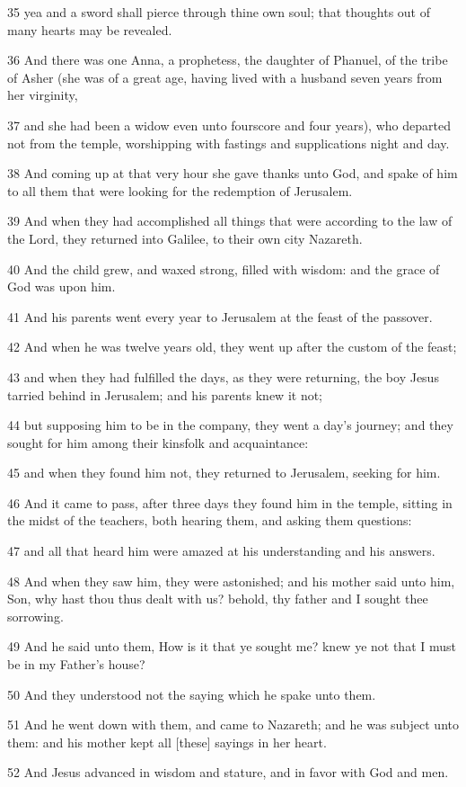 \par 35 yea and a sword shall pierce through thine own soul; that thoughts out of many hearts may be revealed.
\par 36 And there was one Anna, a prophetess, the daughter of Phanuel, of the tribe of Asher (she was of a great age, having lived with a husband seven years from her virginity,
\par 37 and she had been a widow even unto fourscore and four years), who departed not from the temple, worshipping with fastings and supplications night and day.
\par 38 And coming up at that very hour she gave thanks unto God, and spake of him to all them that were looking for the redemption of Jerusalem.
\par 39 And when they had accomplished all things that were according to the law of the Lord, they returned into Galilee, to their own city Nazareth.
\par 40 And the child grew, and waxed strong, filled with wisdom: and the grace of God was upon him.
\par 41 And his parents went every year to Jerusalem at the feast of the passover.
\par 42 And when he was twelve years old, they went up after the custom of the feast;
\par 43 and when they had fulfilled the days, as they were returning, the boy Jesus tarried behind in Jerusalem; and his parents knew it not;
\par 44 but supposing him to be in the company, they went a day's journey; and they sought for him among their kinsfolk and acquaintance:
\par 45 and when they found him not, they returned to Jerusalem, seeking for him.
\par 46 And it came to pass, after three days they found him in the temple, sitting in the midst of the teachers, both hearing them, and asking them questions:
\par 47 and all that heard him were amazed at his understanding and his answers.
\par 48 And when they saw him, they were astonished; and his mother said unto him, Son, why hast thou thus dealt with us? behold, thy father and I sought thee sorrowing.
\par 49 And he said unto them, How is it that ye sought me? knew ye not that I must be in my Father's house?
\par 50 And they understood not the saying which he spake unto them.
\par 51 And he went down with them, and came to Nazareth; and he was subject unto them: and his mother kept all [these] sayings in her heart.
\par 52 And Jesus advanced in wisdom and stature, and in favor with God and men.

